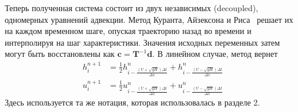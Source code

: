 %
Теперь полученная система состоит из двух независимых (decoupled), одномерных уравнений адвекции.
Метод Куранта, Айзексона и Риса~\cite{A11} решает их на каждом временном шаге, опуская траекторию назад во времени и интерполируя на шаг характеристики. Значения исходных переменных затем могут быть восстановлены как $\mathbf{c}=\mathbf{T}^{-1}\mathbf{d}$. В линейном случае, метод вернет
%
\begin{align}
\label{eq:equation8_3}
h_i^{n+1}&=\frac{1}{2}h_{i-\frac{(U+\sqrt{gH})\Delta t}{\Delta x}}^n+h_{i-\frac{(U-\sqrt{gH})\Delta t}{\Delta x}}^n \nonumber \\ 
u_i^{n+1}&=\frac{1}{2}u_{i-\frac{(U+\sqrt{gH})\Delta t}{\Delta x}}^n+u_{i-\frac{(U-\sqrt{gH})\Delta t}{\Delta x}}^n
\end{align}
%
Здесь используется та же нотация, которая использовалась в разделе 2.


